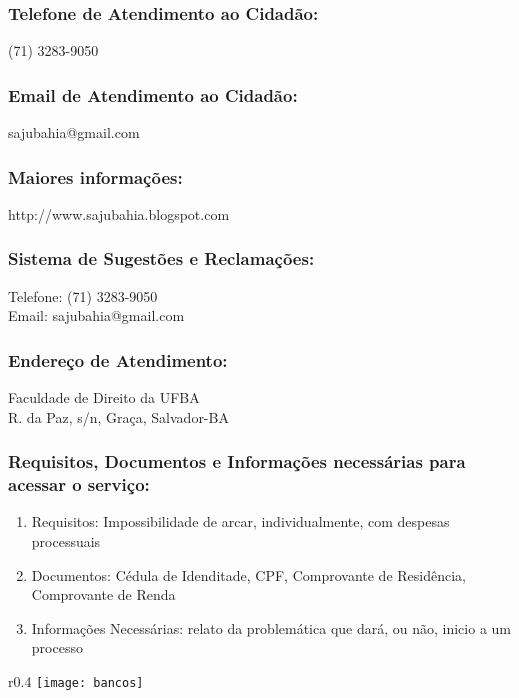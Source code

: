     \subsubsection {Telefone de Atendimento ao Cidadão:}
        (71) 3283-9050

    \subsubsection {Email de Atendimento ao Cidadão:}
        sajubahia@gmail.com
        
    \subsubsection{Maiores informações:}
        http://www.sajubahia.blogspot.com
   
    \subsubsection{Sistema de Sugestões e Reclamações:}
        Telefone: (71) 3283-9050 \\
        Email: sajubahia@gmail.com

    \subsubsection{Endereço de Atendimento:}
        Faculdade de Direito da UFBA \\
        R. da Paz, s/n, Graça, Salvador-BA
        
    \subsubsection{Requisitos, Documentos e Informações necessárias para acessar o serviço:}   
        \begin{enumerate}
            \item  Requisitos: Impossibilidade de arcar, individualmente, com despesas processuais
            \item Documentos: Cédula de Idenditade, CPF, Comprovante de Residência, Comprovante de Renda
            \item Informações Necessárias: relato da problemática que dará, ou não, inicio a um processo
        \end{enumerate}

\begin{wrapfigure}{r}{0.4\textwidth}
        \centering
        \texttt{[image: bancos]}
    \end{wrapfigure}
